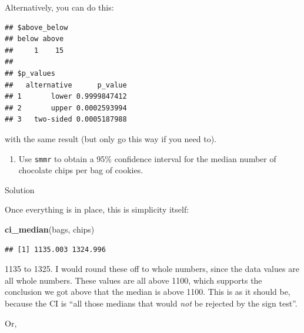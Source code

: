 \documentclass[]{tufte-book}
\newenvironment{Shaded}{}{}
\newcommand{\DecValTok}[1]{\textcolor[rgb]{0.25,0.63,0.44}{#1}}
\newcommand{\KeywordTok}[1]{\textcolor[rgb]{0.00,0.44,0.13}{\textbf{#1}}}
\newcommand{\NormalTok}[1]{#1}
\newcommand{\OperatorTok}[1]{\textcolor[rgb]{0.40,0.40,0.40}{#1}}
\providecommand{\tightlist}{%
  \setlength{\itemsep}{0pt}\setlength{\parskip}{0pt}}
\theoremstyle{definition}
\theoremstyle{definition}
\theoremstyle{definition}
\theoremstyle{remark}
\begin{document}
Alternatively, you can do this:

\begin{Shaded}
\end{Shaded}

\begin{verbatim}
## $above_below
## below above 
##     1    15 
## 
## $p_values
##   alternative      p_value
## 1       lower 0.9999847412
## 2       upper 0.0002593994
## 3   two-sided 0.0005187988
\end{verbatim}

with the same result (but only go this way if you need to).

\begin{enumerate}
\def\labelenumi{(\alph{enumi})}
\setcounter{enumi}{3}
\tightlist
\item
  Use \texttt{smmr} to obtain a 95\% confidence interval for the median
  number of chocolate chips per bag of cookies.
\end{enumerate}

Solution

Once everything is in place, this is simplicity itself:

\begin{Shaded}
\begin{Highlighting}[]
\KeywordTok{ci_median}\NormalTok{(bags, chips)}
\end{Highlighting}
\end{Shaded}

\begin{verbatim}
## [1] 1135.003 1324.996
\end{verbatim}

1135 to 1325. I would round these off to whole numbers, since the data
values are all whole numbers. These values are all above 1100, which
supports the conclusion we got above that the median is above 1100. This
is as it should be, because the CI is ``all those medians that would
\emph{not} be rejected by the sign test''.

Or,

\begin{Shaded}
\end{Shaded}
\end{document}
